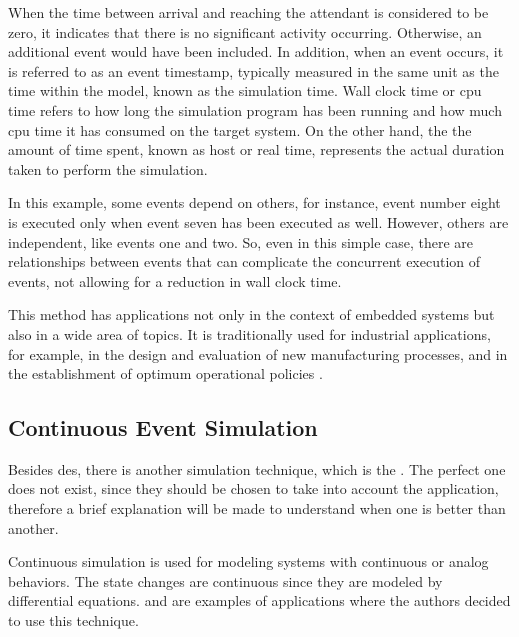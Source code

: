 When the time between arrival and reaching the attendant is considered to be zero, it indicates that there is no significant activity occurring. Otherwise, an additional event would have been included. In addition, when an event occurs, it is referred to as an event timestamp, typically measured in the same unit as the time within the model, known as the simulation time. Wall clock time or \gls{cpu} time refers to how long the simulation program has been running and how much \gls{cpu} time it has consumed on the target system. On the other hand, the the amount of time spent, known as host or real time, represents the actual duration taken to perform the simulation.

In this example, some events depend on others, for instance, event number eight is executed only when event seven has been executed as well. However, others are independent, like events one and two. So, even in this simple case, there are relationships between events that can complicate the concurrent execution of events, not allowing for a reduction in wall clock time.

This method has applications not only in the context of embedded systems but also in a wide area of topics. It is traditionally used for industrial applications, for example, in the design and evaluation of new
manufacturing processes, and in the establishment of optimum operational policies \cite{DES_SoA}. 

 
\subsection{Continuous Event Simulation}

Besides \gls{des}, there is another simulation technique, which is the . The perfect one does not exist, since they should be chosen to take into account the application, therefore a brief explanation will be made to understand when one is better than another.

Continuous simulation is used for modeling systems with continuous or analog behaviors. The state changes are continuous since they are modeled by differential equations. \cite{continousSim1} and \cite{continousSim2} are examples of applications where the authors decided to use this technique. 


